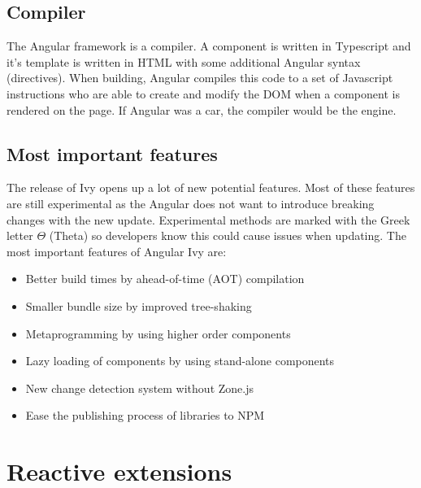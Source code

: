 \subsection{Compiler}
The Angular framework is a compiler. A component is written in Typescript and it's template is written in HTML with some additional Angular syntax (directives). When building, Angular compiles this code to a set of Javascript instructions who are able to create and modify the DOM when a component is rendered on the page. If Angular was a car, the compiler would be the engine.

\subsection{Most important features}
The release of Ivy opens up a lot of new potential features. Most of these features are still experimental as the Angular does not want to introduce breaking changes with the new update. Experimental methods are marked with the Greek letter \(\Theta\) (Theta) so developers know this could cause issues when updating. The most important features of Angular Ivy are:
\begin{itemize}
    \item Better build times by ahead-of-time (AOT) compilation
    \item Smaller bundle size by improved tree-shaking
    \item Metaprogramming by using higher order components \autocite{Savkin2018}
    \item Lazy loading of components by using stand-alone components
    \item New change detection system without Zone.js
    \item Ease the publishing process of libraries to NPM
\end{itemize}

\autocite{Exbrayat2019}

\section {Reactive extensions}
